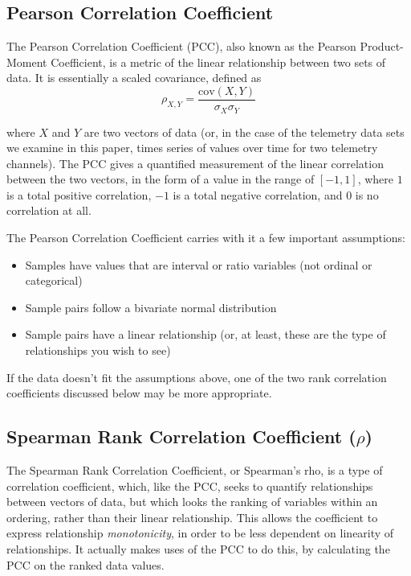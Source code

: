 \subsection{Pearson Correlation Coefficient}

The Pearson Correlation Coefficient (PCC), also known as the Pearson Product-Moment Coefficient, is a metric of the linear relationship between two sets of data. It is essentially a scaled covariance, defined as \\

\begin{equation} \label{eq:pcc}
\rho_{X, Y} = \frac{\mathrm{cov}(X, Y)}{\sigma_{X} \sigma_{Y}}
\end{equation}

where $X$ and $Y$ are two vectors of data (or, in the case of the telemetry data sets we examine in this paper, times series of values over time for two telemetry channels). The PCC gives a quantified measurement of the linear correlation between the two vectors, in the form of a value in the range of $[-1, 1]$, where $1$ is a total positive correlation, $-1$ is a total negative correlation, and $0$ is no correlation at all.

The Pearson Correlation Coefficient carries with it a few important assumptions:

\begin{itemize}
\item Samples have values that are interval or ratio variables (not ordinal or categorical)
\item Sample pairs follow a bivariate normal distribution
\item Sample pairs have a linear relationship (or, at least, these are the type of relationships you wish to see)
\end{itemize}

If the data doesn't fit the assumptions above, one of the two rank correlation coefficients discussed below may be more appropriate.

\subsection{Spearman Rank Correlation Coefficient ($\rho$)}

The Spearman Rank Correlation Coefficient, or Spearman's rho, is a type of correlation coefficient, which, like the PCC, seeks to quantify relationships between vectors of data, but which looks the ranking of variables within an ordering, rather than their linear relationship. This allows the coefficient to express relationship \textit{monotonicity}, in order to be less dependent on linearity of relationships. It actually makes uses of the PCC to do this, by calculating the PCC on the ranked data values.


